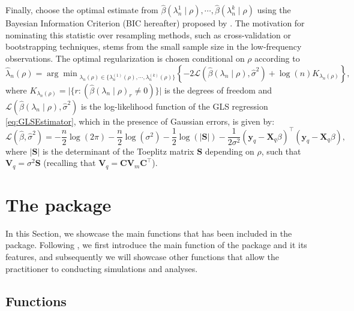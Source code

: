 Finally, \citet{10-1111rssa-12952} choose the optimal estimate from \(\hat{\beta}(\lambda_n^{1}\mid \rho),\cdots,\hat{\beta}(\lambda_n^{k}\mid \rho)\) using the Bayesian Information Criterion (BIC hereafter) proposed by \citet{schwarz1978estimating}. The motivation for nominating this statistic over resampling methods, such as cross-validation or bootstrapping techniques, stems from the small sample size in the low-frequency observations. The optimal regularization is chosen conditional on \(\rho\) according to
\begin{equation}
\hat{\lambda}_n(\rho)={\arg\min}_{\lambda_n(\rho)\in\{\lambda_n^{(1)}(\rho),\cdots,\lambda_n^{(k)}(\rho)\}}\left\{-2\mathcal{L}\left(\hat{\beta}(\lambda_n\mid \rho),\hat{\sigma}^2\right)+\log(n)K_{\lambda_n(\rho)}\right\},
\label{eq:BIC}
\end{equation}
where \(K_{\lambda_n(\rho)}=\lvert \{r:(\hat{\beta}(\lambda_n\mid \rho)_r\neq 0)\}\rvert\) is the degrees of freedom and \(\mathcal{L}(\hat{\beta}(\lambda_n\mid \rho),\hat{\sigma}^2)\) is the log-likelihood function of the GLS regression \eqref{eq:GLSEstimator}, which in the presence of Gaussian errors, is given by:
\begin{equation}
\mathcal{L}(\hat{\beta},\hat{\sigma}^2)=-\frac{n}{2}\log(2\pi)-\frac{n}{2}\log(\sigma^2)-\frac{1}{2}\log(\lvert \mathbf{S}\rvert)-\frac{1}{2\sigma^2}(\mathbf{y}_q-\mathbf{X}_q\beta)^\top(\mathbf{y}_q-\mathbf{X}_q\beta),
\end{equation}
where \(\lvert \mathbf{S}\rvert\) is the determinant of the Toeplitz matrix \(\mathbf{S}\) depending on \(\rho\), such that \(\mathbf{V}_q=\sigma^2\mathbf{S}\) (recalling that \(\mathbf{V}_q=\mathbf{C}\mathbf{V}_m\mathbf{C}^{\top}\)).

\hypertarget{The-package}{%
\section{The package}\label{The-package}}

In this Section, we showcase the main functions that has been included in the  package. Following \citet{sax2016package}, we first introduce the main function of the package and it its features, and subsequently we will showcase other functions that allow the practitioner to conducting simulations and analyses.

\hypertarget{functions}{%
\subsection{Functions}\label{functions}}

